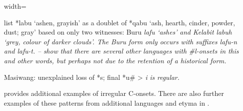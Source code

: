 \begin{table}[p]
\begin{adjustbox}{width=\textwidth}
\begin{threeparttable}
		\begin{tablenotes}\tnsize
			\item[†]	{\citet{BlustTrussel2020} list *labu ‘ashen,
								grayish’ as a doublet of *qabu ‘ash,
								hearth, cinder, powder, dust; gray’ based on only two witnesses:
								Buru \it{lafu} ‘ashes’ and Kelabit \it{labuh} ‘grey,
								colour of darker clouds’.
								The Buru form only occurs with suffixes \it{lafu-n} and \it{lafu-t}.
								-- show that
								there are several other languages with {\#}l-onsets in this
								and other words, but perhaps not due to the retention of a historical form.}
			\item[‡]	{Masiwang: unexplained loss of *s; final *u{\#} > \it{i} is regular.}
		\end{tablenotes}
	\end{threeparttable}
\end{adjustbox}
\end{table}

 provides additional examples of irregular C-onsets.
There are also further examples of these patterns from additional
languages and etyma in \citet[120--128]{Collins1982d,Collins1983}.

